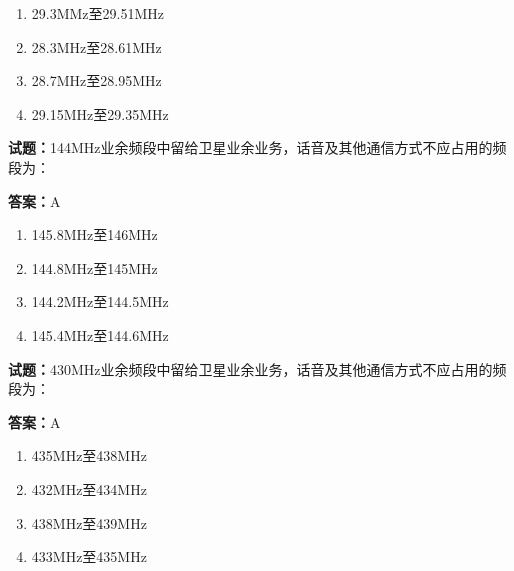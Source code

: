 \documentclass{ctexbook}
\begin{document}
\begin{enumerate}[leftmargin=3em]
  \item 29.3MMz至29.51MHz 

  \item 28.3MHz至28.61MHz 

  \item 28.7MHz至28.95MHz 

  \item 29.15MHz至29.35MHz 

\end{enumerate}





\vspace{1em}

\textbf{试题：}144MHz业余频段中留给卫星业余业务，话音及其他通信方式不应占用的频段为： 

\textbf{答案：}A 

\begin{enumerate}[leftmargin=3em]
  \item 145.8MHz至146MHz 

  \item 144.8MHz至145MHz 

  \item 144.2MHz至144.5MHz 

  \item 145.4MHz至144.6MHz 

\end{enumerate}





\vspace{1em}

\textbf{试题：}430MHz业余频段中留给卫星业余业务，话音及其他通信方式不应占用的频段为： 

\textbf{答案：}A 

\begin{enumerate}[leftmargin=3em]
  \item 435MHz至438MHz 

  \item 432MHz至434MHz 

  \item 438MHz至439MHz 

  \item 433MHz至435MHz 

\end{enumerate}
\end{document}
